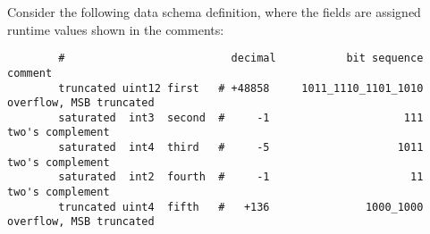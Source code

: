 \begin{remark}
    Consider the following data schema definition,
    where the fields are assigned runtime values shown in the comments:

    \begin{verbatim}
        #                          decimal           bit sequence   comment
        truncated uint12 first   # +48858     1011_1110_1101_1010   overflow, MSB truncated
        saturated  int3  second  #     -1                     111   two's complement
        saturated  int4  third   #     -5                    1011   two's complement
        saturated  int2  fourth  #     -1                      11   two's complement
        truncated uint4  fifth   #   +136               1000_1000   overflow, MSB truncated
    \end{verbatim}


\end{remark}
